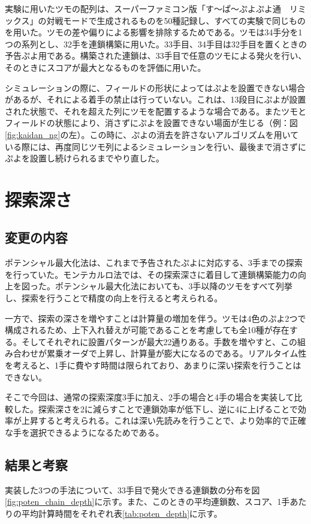 \documentclass[12pt]{jarticle}
\begin{document}
実験に用いたツモの配列は、スーパーファミコン版「す～ぱ～ぷよぷよ通　リミックス」の対戦モードで生成されるものを50種記録し、すべての実験で同じものを用いた。ツモの差や偏りによる影響を排除するためである。ツモは34手分を1つの系列とし、32手を連鎖構築に用いた。33手目、34手目は32手目を置くときの予告ぷよ用である。構築された連鎖は、33手目で任意のツモによる発火を行い、そのときにスコアが最大となるものを評価に用いた。

シミュレーションの際に、フィールドの形状によってはぷよを設置できない場合があるが、それによる着手の禁止は行っていない。これは、13段目にぷよが設置された状態で、それを超えた列にツモを配置するような場合である。またツモとフィールドの状態により、消さずにぷよを設置できない場面が生じる（例：図\ref{fig:kaidan_ng}の左）。この時に、ぷよの消去を許さないアルゴリズムを用いている際には、再度同じツモ列によるシミュレーションを行い、最後まで消さずにぷよを設置し続けられるまでやり直した。

\section{探索深さ}
\subsection{変更の内容}
ポテンシャル最大化法は、これまで予告されたぷよに対応する、3手までの探索を行っていた。モンテカルロ法\cite{puyo_monte}では、その探索深さに着目して連鎖構築能力の向上を図った。ポテンシャル最大化法においても、3手以降のツモをすべて列挙し、探索を行うことで精度の向上を行えると考えられる。

一方で、探索の深さを増やすことは計算量の増加を伴う。ツモは4色のぷよ2つで構成されるため、上下入れ替えが可能であることを考慮しても全10種が存在する。そしてそれぞれに設置パターンが最大22通りある。手数を増やすと、この組み合わせが累乗オーダで上昇し、計算量が膨大になるのである。リアルタイム性を考えると、1手に費やす時間は限られており、あまりに深い探索を行うことはできない。

そこで今回は、通常の探索深度3手に加え、2手の場合と4手の場合を実装して比較した。探索深さを2に減らすことで連鎖効率が低下し、逆に4に上げることで効率が上昇すると考えられる。これは深い先読みを行うことで、より効率的で正確な手を選択できるようになるためである。

\subsection{結果と考察}
実装した3つの手法について、33手目で発火できる連鎖数の分布を図\ref{fig:poten_chain_depth}に示す。また、このときの平均連鎖数、スコア、1手あたりの平均計算時間をそれぞれ表\ref{tab:poten_depth}に示す。
\end{document}
